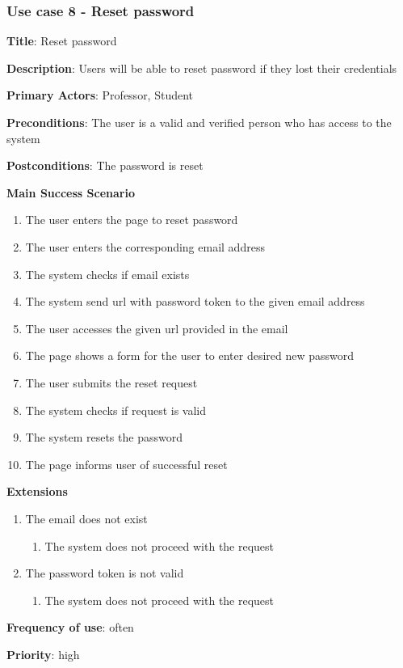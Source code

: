 \documentclass[singlespacing,12pt,parskip,headsepline,consistentlayout]{article}
\begin{document}
\subsubsection{Use case 8 - Reset password}
\begin{flushleft}
\vspace{0.2cm}
\hline
\vspace{0.2cm}
{\bfseries Title}: {Reset password}

{\bfseries Description}: {Users will be able to reset password if they lost their credentials}

{\bfseries Primary Actors}: {Professor, Student}

{\bfseries Preconditions}: The user is a valid and verified person who has access to the system

{\bfseries Postconditions}: {The password is reset}

{\bfseries Main Success Scenario}

\begin{enumerate}
      \item The user enters the page to reset password
      \item The user enters the corresponding email address
      \item The system checks if email exists
      \item The system send url with password token to the given email address
      \item The user accesses the given url provided in the email
      \item The page shows a form for the user to enter desired new password
      \item The user submits the reset request
      \item The system checks if request is valid
      \item The system resets the password
      \item The page informs user of successful reset
\end{enumerate}
 
{\bfseries Extensions}

\begin{enumerate}
  \item The email does not exist
  \begin{enumerate}
      \item The system does not proceed with the request
  \end{enumerate}
  \item The password token is not valid
  \begin{enumerate}
      \item The system does not proceed with the request
  \end{enumerate}
\end{enumerate}

{\bfseries Frequency of use}: often

{\bfseries Priority}: high

\end{flushleft}
\end{document}
